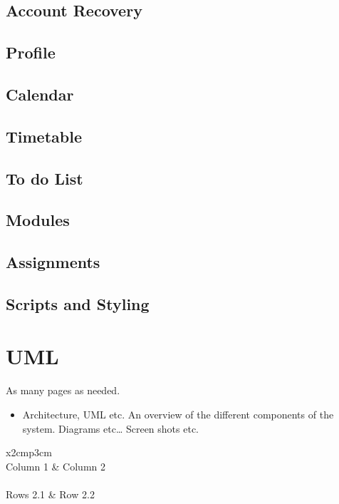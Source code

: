 \subsection{Account Recovery}

\subsection{Profile}

\subsection{Calendar}

\subsection{Timetable}

\subsection{To do List}

\subsection{Modules}

\subsection{Assignments}

\subsection{Scripts and Styling}

\section{UML}

As many pages as needed.
\begin{itemize}
\item Architecture, UML etc. An overview of the different components of the system. Diagrams etc… Screen shots etc.
\end{itemize}

\begin{table}[h]
  \centering
  \begin{tabular}{x{2cm}p{3cm}}
    \toprule \\
    Column 1 & Column 2 \\
    \midrule \\
    Rows 2.1 & Row 2.2 \\
    \bottomrule
  \end{tabular}
  \caption{A table.}
  \label{table:mytable}
\end{table}

